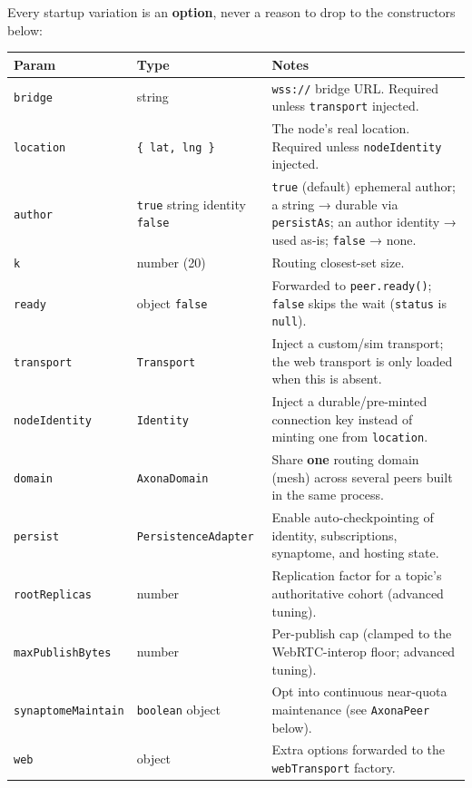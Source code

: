 \documentclass[
  nobib]{tufte-handout}
\newcounter{none} %
\begin{document}
Every startup variation is an \textbf{option}, never a reason to drop to the
constructors below:

{\def\LTcaptype{none} %
\begin{longtable}[]{@{}
  >{\raggedright\arraybackslash}p{}
  >{\raggedright\arraybackslash}p{}
  >{\raggedright\arraybackslash}p{}@{}}
\toprule\noalign{}
\begin{minipage}[b]{\linewidth}\raggedright
Param
\end{minipage} & \begin{minipage}[b]{\linewidth}\raggedright
Type
\end{minipage} & \begin{minipage}[b]{\linewidth}\raggedright
Notes
\end{minipage} \\
\midrule\noalign{}
\endhead
\bottomrule\noalign{}
\endlastfoot
\texttt{bridge} & string & \texttt{wss://} bridge URL. Required unless
\texttt{transport} injected. \\
\texttt{location} & \texttt{\{\ lat,\ lng\ \}} & The node's real
location. Required unless \texttt{nodeIdentity} injected. \\
\texttt{author} & \texttt{true} \textbar{} string \textbar{} identity
\textbar{} \texttt{false} & \texttt{true} (default) ephemeral author; a
string → durable via \texttt{persistAs}; an author identity → used
as-is; \texttt{false} → none. \\
\texttt{k} & number (20) & Routing closest-set size. \\
\texttt{ready} & object \textbar{} \texttt{false} & Forwarded to
\texttt{peer.ready()}; \texttt{false} skips the wait (\texttt{status} is
\texttt{null}). \\
\texttt{transport} & \texttt{Transport} & Inject a custom/sim transport;
the web transport is only loaded when this is absent. \\
\texttt{nodeIdentity} & \texttt{Identity} & Inject a durable/pre-minted
connection key instead of minting one from \texttt{location}. \\
\texttt{domain} & \texttt{AxonaDomain} & Share \textbf{one} routing domain
(mesh) across several peers built in the same process. \\
\texttt{persist} & \texttt{PersistenceAdapter} & Enable auto-checkpointing
of identity, subscriptions, synaptome, and hosting state. \\
\texttt{rootReplicas} & number & Replication factor for a topic's
authoritative cohort (advanced tuning). \\
\texttt{maxPublishBytes} & number & Per-publish cap (clamped to the
WebRTC-interop floor; advanced tuning). \\
\texttt{synaptomeMaintain} & \texttt{boolean} \textbar{} object & Opt into
continuous near-quota maintenance (see \texttt{AxonaPeer} below). \\
\texttt{web} & object & Extra options forwarded to the
\texttt{webTransport} factory. \\
\end{longtable}
}
\end{document}
